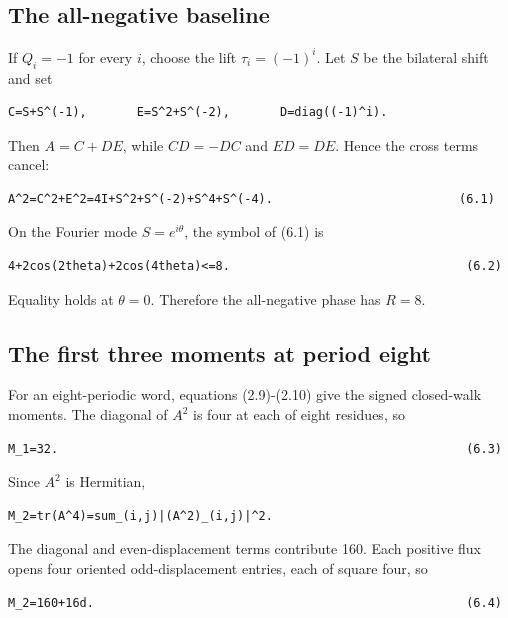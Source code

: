 \subsection{The all-negative baseline}

If \(Q_i=-1\) for every \(i\), choose the lift \(\tau_i=(-1)^i\). Let \(S\) be the
bilateral shift and set

\begin{lstlisting}[language={}]
C=S+S^(-1),       E=S^2+S^(-2),       D=diag((-1)^i).
\end{lstlisting}

Then \(A=C+DE\), while \(CD=-DC\) and \(ED=DE\). Hence the cross terms cancel:

\begin{lstlisting}[language={}]
A^2=C^2+E^2=4I+S^2+S^(-2)+S^4+S^(-4).                          (6.1)
\end{lstlisting}

On the Fourier mode \(S=e^{i \theta}\), the symbol of (6.1) is

\begin{lstlisting}[language={}]
4+2cos(2theta)+2cos(4theta)<=8.                                 (6.2)
\end{lstlisting}

Equality holds at \(\theta=0\). Therefore the all-negative phase has \(R=8\).

\subsection{The first three moments at period eight}

For an eight-periodic word, equations (2.9)-(2.10) give the signed closed-walk
moments. The diagonal of \(A^2\) is four at each of eight residues, so

\begin{lstlisting}[language={}]
M_1=32.                                                         (6.3)
\end{lstlisting}

Since \(A^2\) is Hermitian,

\begin{lstlisting}[language={}]
M_2=tr(A^4)=sum_(i,j)|(A^2)_(i,j)|^2.
\end{lstlisting}

The diagonal and even-displacement terms contribute 160. Each positive flux
opens four oriented odd-displacement entries, each of square four, so

\begin{lstlisting}[language={}]
M_2=160+16d.                                                    (6.4)
\end{lstlisting}

